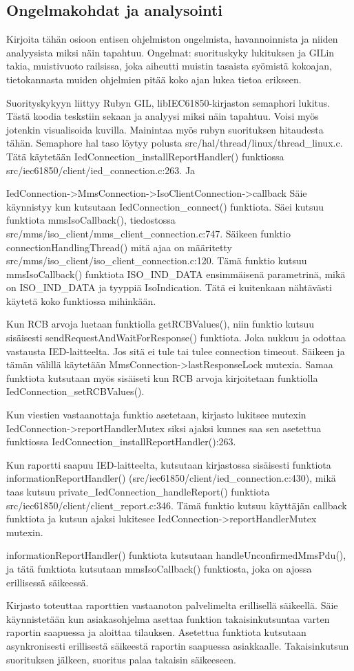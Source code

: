 \subsection{Ongelmakohdat ja analysointi}
\begin{it}
	Kirjoita tähän osioon entisen ohjelmiston ongelmista, havannoinnista ja niiden analyysista miksi näin tapahtuu.
	Ongelmat: suorituskyky lukituksen ja GILin takia, muistivuoto railsissa, joka aiheutti muistin tasaista syömistä kokoajan, tietokannasta muiden ohjelmien pitää koko ajan lukea tietoa erikseen.

	Suorityskykyyn liittyy Rubyn GIL, libIEC61850-kirjaston semaphori lukitus. Tästä koodia teskstiin sekaan ja analyysi miksi näin tapahtuu. Voisi myös jotenkin visualisoida kuvilla. Mainintaa myös rubyn suorituksen hitaudesta tähän.
	Semaphore hal taso löytyy polusta src/hal/thread/linux/thread\_linux.c.
	Tätä käytetään IedConnection\_installReportHandler() funktiossa src/iec61850/client/ied\_connection.c:263. Ja 

	IedConnection->MmsConnection->IsoClientConnection->callback
	Säie käynnistyy kun kutsutaan IedConnection\_connect() funktiota. Säei kutsuu funktiota mmsIsoCallback(), tiedostossa src/mms/iso\_client/mms\_client\_connection.c:747.
	Säikeen funktio connectionHandlingThread() mitä ajaa on määritetty src/mms/iso\_client/iso\_client\_connection.c:120.
	Tämä funktio kutsuu mmsIsoCallback() funktiota ISO\_IND\_DATA ensimmäisenä parametrinä, mikä on ISO\_IND\_DATA ja tyyppiä IsoIndication. Tätä ei kuitenkaan nähtävästi käytetä koko funktiossa mihinkään.

	Kun RCB arvoja luetaan funktiolla getRCBValues(), niin funktio kutsuu sisäisesti sendRequestAndWaitForResponse() funktiota. Joka nukkuu ja odottaa vastausta IED-laitteelta. Jos sitä ei tule tai tulee connection timeout. Säikeen ja tämän välillä käytetään MmsConnection->lastResponseLock mutexia. Samaa funktiota kutsutaan myös sisäiseti kun RCB arvoja kirjoitetaan funktiolla IedConnection\_setRCBValues().

	Kun viestien vastaanottaja funktio asetetaan, kirjasto lukitsee mutexin IedConnection->reportHandlerMutex siksi ajaksi kunnes saa sen asetettua funktiossa IedConnection\_installReportHandler():263.

	Kun raportti saapuu IED-laitteelta, kutsutaan kirjastossa sisäisesti funktiota informationReportHandler() (src/iec61850/client/ied\_connection.c:430), mikä taas kutsuu private\_IedConnection\_handleReport() funktiota src/iec61850/client/client\_report.c:346. Tämä funktio kutsuu käyttäjän callback funktiota ja kutsun ajaksi lukitesee IedConnection->reportHandlerMutex mutexin.
	
	informationReportHandler() funktiota kutsutaan handleUnconfirmedMmsPdu(), ja tätä funktiota kutsutaan mmsIsoCallback() funktiosta, joka on ajossa erillisessä säikeessä.
\end{it}
Kirjasto toteuttaa raporttien vastaanoton palvelimelta erillisellä säikeellä. Säie käynnistetään kun asiakasohjelma asettaa funktion takaisinkutsuntaa varten raportin saapuessa ja aloittaa tilauksen. Asetettua funktiota kutsutaan asynkronisesti erillisestä säikeestä raportin saapuessa asiakkaalle. Takaisinkutsun suorituksen jälkeen, suoritus palaa takaisin säikeeseen.


